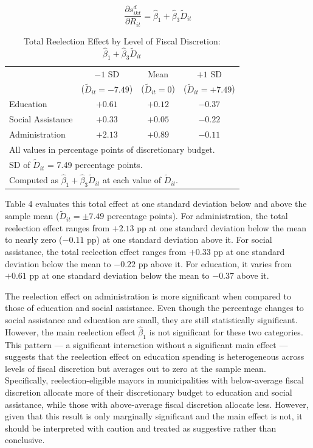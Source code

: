 \documentclass[12pt, a4paper]{article}
\begin{document}
\begin{equation}
    \frac{\partial s^{d}_{ikt}}{\partial R_{it}} = \hat{\beta}_1 + \hat{\beta}_3 \tilde{D}_{it}
\end{equation}

\begin{table}[htbp]
\centering
\caption{Total Reelection Effect by Level of Fiscal Discretion: $\hat{\beta}_1 + \hat{\beta}_3 \tilde{D}_{it}$}
\label{tab:conditional}
\begin{tabular}{lccc}
\hline\hline
 & $-1$ SD & Mean & $+1$ SD \\
 & ($\tilde{D}_{it} = -7.49$) & ($\tilde{D}_{it} = 0$) & ($\tilde{D}_{it} = +7.49$) \\
\hline
Education         & $+0.61$ & $+0.12$ & $-0.37$ \\
Social Assistance & $+0.33$ & $+0.05$ & $-0.22$ \\
Administration    & $+2.13$ & $+0.89$ & $-0.11$ \\
\hline\hline
\multicolumn{4}{l}{\footnotesize All values in percentage points of discretionary budget.} \\
\multicolumn{4}{l}{\footnotesize SD of $\tilde{D}_{it}$ = 7.49 percentage points.} \\
\multicolumn{4}{l}{\footnotesize Computed as $\hat{\beta}_1 + \hat{\beta}_3 \tilde{D}_{it}$ at each value of $\tilde{D}_{it}$.} \\
\end{tabular}
\end{table}

Table 4 evaluates this total effect at one standard deviation below and above the sample mean ($\tilde{D}_{it} = \pm 7.49$ percentage points). For administration, the total reelection effect ranges from $+2.13$ pp at one standard deviation below the mean to nearly zero ($-0.11$ pp) at one standard deviation above it. For social assistance, the total reelection effect ranges from $+0.33$ pp at one standard deviation below the mean to $-0.22$ pp above it. For education, it varies from $+0.61$ pp at one standard deviation below the mean to $-0.37$ above it.

The reelection effect on administration is more significant when compared to those of education and social assistance. Even though the percentage changes to social assistance and education are small, they are still statistically significant. However, the main reelection effect $\hat{\beta}_1$ is not significant for these two categories. This pattern --- a significant interaction without a significant main effect --- suggests that the reelection effect on education spending is heterogeneous across levels of fiscal discretion but averages out to zero at the sample mean. Specifically, reelection-eligible mayors in municipalities with below-average fiscal discretion allocate more of their discretionary budget to education and social assistance, while those with above-average fiscal discretion allocate less.  However, given that this result is only marginally significant and the main effect is not, it should be interpreted with caution and treated as suggestive rather than conclusive.
\end{document}
